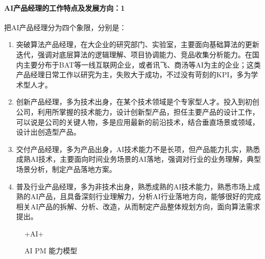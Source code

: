 \documentclass[letterpaper,11pt,english]{sphinxmanual}
\begin{document}
\paragraph{AI产品经理的工作特点及发展方向：1\sphinxfootnotemark[227]}
\label{\detokenize{chapter_introduction/AI_PM:ai-1}}%
\begin{footnotetext}[227]\sphinxAtStartFootnote
{}
%
\end{footnotetext}\ignorespaces 
把AI产品经理分为四个象限，分别是：
\begin{enumerate}
%
\item {} 
突破算法产品经理，在大企业的研究部门、实验室，主要面向基础算法的更新迭代，强调对底层算法的逻辑理解、项目协调能力、竞品收集分析能力。在国内主要分布于BAT等一线互联网企业，或者讯飞、商汤等AI为主的企业；这类产品经理日常工作以研究为主，失败大于成功，不过没有苛刻的KPI，多为学术型人才。

\item {} 
创新产品经理，多为技术出身，在某个技术领域是个专家型人才。投入到初创公司，利用所掌握的技术能力，设计创新型产品，担任主要产品的设计工作，可以说是公司的关键人物，多是应用最新的前沿技术，结合垂直场景或领域，设计出创造型产品。

\item {} 
交付产品经理，多为产品出身，AI技术能力不是长项，但产品能力扎实，熟悉成熟AI技术，主要面向时间业务场景的AI落地，强调对行业的业务理解，典型场景分析，制定产品落地方案。

\item {} 
普及行业产品经理，多为非技术出身，熟悉成熟的AI技术能力，熟悉市场上成熟的AI产品，且具备深刻行业理解力，分析AI行业落地方向，能够很好的完成相关AI产品的拆解、分析、改造，从而制定产品整体规划方向，面向算法需求提出。

\end{enumerate}

\begin{figure}[H]
\centering
\capstart

\noindent{}
\caption{+AI+\sphinxfootnotemark[228]}\label{\detokenize{chapter_introduction/AI_PM:id49}}\end{figure}
%
\begin{footnotetext}[228]\sphinxAtStartFootnote
{}
%
\end{footnotetext}\ignorespaces 
\begin{figure}[H]
\centering
\capstart

\noindent{}
\caption{AI PM 能力模型}\label{\detokenize{chapter_introduction/AI_PM:id50}}\end{figure}
\end{document}
